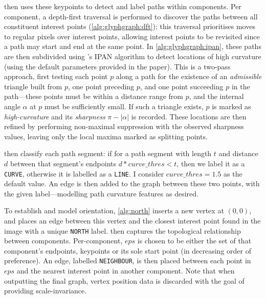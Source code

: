 \documentclass{mpaper}
\begin{document}
 then uses these keypoints to detect and label paths within components.
Per component, a depth-first traversal is performed to discover the paths between all constituent interest points (\cref{alg:glyphgraph:dft}); this traversal prioritises moves to regular pixels over interest points, allowing interest points to be revisited since a path may start and end at the same point.
In \cref{alg:glyphgraph:ipan}, these paths are then subdivided using \citeauthor{PathCurvature}'s IPAN algorithm \cite{PathCurvature} to detect locations of high curvature (using the default parameters provided in the paper).
This is a two-pass approach, first testing each point $p$ along a path for the existence of an \emph{admissible} triangle built from $p$, one point preceding $p$, and one point succeeding $p$ in the path---these points must be within a distance range from $p$, and the internal angle $\alpha$ at $p$ must be sufficiently small.
If such a triangle exists, $p$ is marked as \emph{high-curvature} and its \emph{sharpness} $\pi - |\alpha|$ is recorded.
These locations are then refined by performing non-maximal suppression with the observed sharpness values, leaving only the local maxima marked as splitting points.

 then classify each path segment: if for a path segment with length $t$ and distance $d$ between that segment's endpoints $d * \mathit{curve\_thres} < t$, then we label it as a \texttt{CURVE}, otherwise it is labelled as a \texttt{LINE}.
I consider $\mathit{curve\_thres} = 1.5$ as the default value.
An edge is then added to the graph between these two points, with the given label---modelling path curvature features as desired.

To establish and model orientation, \cref{alg:north} inserts a new vertex at $(0,0)$, and places an edge between this vertex and the closest interest point found in the image with a unique \texttt{NORTH} label.
 then captures the topological relationship between components.
Per-component, $\mathit{eps}$ is chosen to be either the set of that component's endpoints, keypoints or its sole start point (in decreasing order of preference).
An edge, labelled \texttt{NEIGHBOUR}, is then placed between each point in $\mathit{eps}$ and the nearest interest point in another component.
Note that when outputting the final graph, vertex position data is discarded with the goal of providing scale-invariance.

\end{document}
